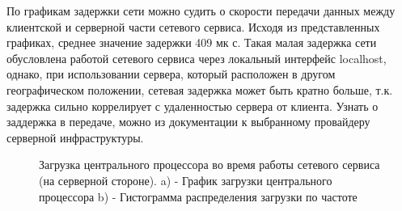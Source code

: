 \documentclass[a4paper, 14pt]{extreport}
\begin{document}
\par По графикам задержки сети можно судить о скорости передачи данных между клиентской и серверной части сетевого сервиса. Исходя из 
представленных графиках, среднее значение задержки 409 мк с. Такая малая задержка сети обусловлена работой сетевого сервиса через 
локальный интерфейс localhost, однако, при использовании сервера, который расположен в другом географическом положении, сетевая задержка 
может быть кратно больше, т.к. задержка сильно коррелирует с удаленностью сервера от клиента. Узнать о заддержка в передаче, 
можно из документации к выбранному провайдеру серверной инфраструктуры.
\begin{figure}[ht]
\begin{minipage}[h]{\linewidth}
\end{minipage}
\begin{minipage}[h]{\linewidth}
\end{minipage}
\caption{Загрузка центрального процессора во время работы сетевого сервиса (на серверной стороне). a) - График загрузки центрального процессора b) - Гистограмма распределения загрузки по частоте}
\label{ris:image1}
\end{figure}
\end{document}
